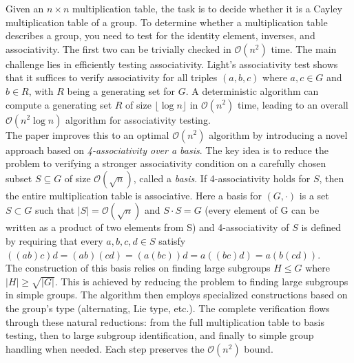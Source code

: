 
Given an \(n \times n\) multiplication table, the task is to decide whether it is a Cayley multiplication table of a group. To determine whether a multiplication table describes a group, you need to test for the identity element, inverses, and associativity. The first two can be trivially checked in \(\mathcal{O}(n^2)\) time. The main challenge lies in efficiently testing associativity. Light's associativity test shows that it suffices to verify associativity for all triples \((a, b, c)\) where \(a, c \in G\) and \(b \in R\), with \(R\) being a generating set for \(G\). A deterministic algorithm can compute a generating set \(R\) of size \(\lfloor \log n \rfloor\) in \(\mathcal{O}(n^2)\) time, leading to an overall \(\mathcal{O}(n^2 \log n)\) algorithm for associativity testing. 
\\
The paper improves this to an optimal \(\mathcal{O}(n^2)\) algorithm by introducing a novel approach based on \emph{4-associativity over a basis}. The key idea is to reduce the problem to verifying a stronger associativity condition on a carefully chosen subset \(S \subseteq G\) of size \(\mathcal{O}(\sqrt{n})\), called a \emph{basis}. If 4-associativity holds for \(S\), then the entire multiplication table is associative. Here a basis for \((G, \cdot)\) is a set \(S \subset G\) such that \(|S| = \mathcal{O}(\sqrt{n})\) and \(S \cdot S = G\) (every element of G can be written as a product of two elements from S) and 4-associativity of \(S\) is defined by requiring that every \(a, b, c, d \in S\) satisfy \(((ab)c)d = (ab)(cd) = (a(bc))d = a((bc)d) = a(b(cd))\).
\\
The construction of this basis relies on finding large subgroups \(H \leq G\) where \(|H| \geq \sqrt{|G|}\). This is achieved by reducing the problem to finding large subgroups in simple groups. The algorithm then employs specialized constructions based on the group's type (alternating, Lie type, etc.).
The complete verification flows through these natural reductions: from the full multiplication table to basis testing, then to large subgroup identification, and finally to simple group handling when needed. Each step preserves the \(\mathcal{O}(n^2)\) bound.